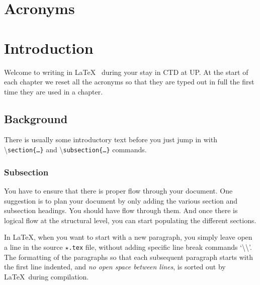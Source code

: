 \documentclass[a4paper,11pt,fleqn]{report}
\begin{document}


\tableofcontents
\listoffigures{}
\listoftables{}

\chapter*{Acronyms}
\begin{acronym}[ABCDEF]
\end{acronym}

\chapter{Introduction}
\setcounter{page}{1}
\acresetall
Welcome to writing in \LaTeX~ during your stay in \ac{CTD} at \ac{UP}.
At the start of each chapter we reset all the acronyms so that they are typed out in full the first time they are used in a chapter. 

\section{Background}

There is usually some introductory text before you just jump in with \textbackslash\texttt{section\{\ldots\}} and \textbackslash\texttt{subsection\{\ldots\}} commands.

\subsection{Subsection}
You have to ensure that there is proper flow through your document. 
One suggestion is to plan your document by only adding the various section and subsection headings. 
You should have flow through them. 
And once there is logical flow at the structural level, you can start populating the different sections.

In \LaTeX, when you want to start with a new paragraph, you simply leave open a line in the source \texttt{$\star$.tex} file, without adding specific line break commands `\textbackslash\textbackslash'. 
The formatting of the paragraphs so that each subsequent paragraph starts with the first line indented, and \emph{no open space between lines}, is sorted out by \LaTeX~during compilation.
\end{document}
